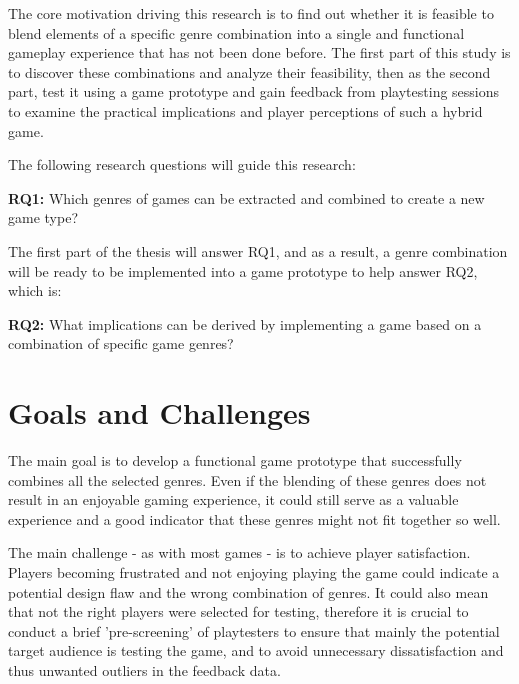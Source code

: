 The core motivation driving this research is to find out whether it is feasible to blend elements of a specific genre combination into a single and functional gameplay experience that has not been done before. The first part of this study is to discover these combinations and analyze their feasibility, then as the second part, test it using a game prototype and gain feedback from playtesting sessions to examine the practical implications and player perceptions of such a hybrid game.

The following research questions will guide this research:

\textbf{RQ1:} Which genres of games can be extracted and combined to create a new game type?

The first part of the thesis will answer RQ1, and as a result, a genre combination will be ready to be implemented into a game prototype to help answer RQ2, which is:


\textbf{RQ2:} What implications can be derived by implementing a game based on a combination of specific game genres?



\section{Goals and Challenges}

The main goal is to develop a functional game prototype that successfully combines all the selected genres. Even if the blending of these genres does not result in an enjoyable gaming experience, it could still serve as a valuable experience and a good indicator that these genres might not fit together so well.

The main challenge - as with most games - is to achieve player satisfaction. Players becoming frustrated and not enjoying playing the game could indicate a potential design flaw and the wrong combination of genres. It could also mean that not the right players were selected for testing, therefore it is crucial to conduct a brief 'pre-screening' of playtesters to ensure that mainly the potential target audience is testing the game, and to avoid unnecessary dissatisfaction and thus unwanted outliers in the feedback data.